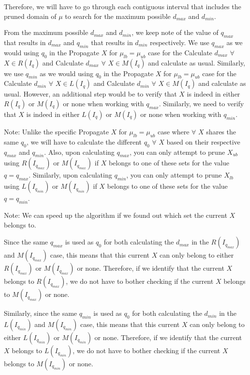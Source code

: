 \documentclass[a4paper,12pt]{article}
\begin{document}
%

Therefore, we will have to go through each contiguous interval that includes the pruned domain of $\mu$ to search for the maximum possible $d_{max}$ and $d_{min}$. 

From the maximum possible $d_{max}$ and $d_{min}$, we keep note of the value of $q_{max}$ that results in $d_{max}$ and $q_{min}$ that results in $d_{min}$ respectively. We use $q_{max}$ as we would using $q_{0}$ in the Propagate $X$ for $\mu_{lb}=\mu_{ub}$ case for the Calculate $d_{max}$ $\forall$ $X \in R(I_{q})$ and Calculate $d_{max}$ $\forall$ $X \in M(I_{q})$ and calculate as usual. Similarly, we use $q_{min}$
as we would using $q_{0}$ in the Propagate $X$ for $\mu_{lb}=\mu_{ub}$ case for the Calculate $d_{min}$ $\forall$ $X \in L(I_{q})$ and Calculate $d_{min}$ $\forall$ $X \in M(I_{q})$ and calculate as usual. However, an additional step would be to verify that $X$ is indeed in either $R(I_{q})$ or $ M(I_{q})$ or none when working with $q_{max}$. Similarly, we need to verify that $X$ is indeed in either $L(I_{q})$ or $M(I_{q})$ or none when working with $q_{min}$.

Note: Unlike the specific Propagate $X$ for $\mu_{lb}=\mu_{ub}$ case where $\forall$ $X$ shares the same $q_{0}$, we will have to calculate the different $q_{0}$ $\forall$ $X$ based on their respective $q_{max}$ and $q_{min}$. Also, upon calculating $q_{max}$, you can only attempt to prune $X_{ub}$ using $R(I_{q_{max}})$ or $M(I_{q_{max}})$ if $X$ belongs to one of these sets for the value $q = q_{max}$. Similarly, upon calculating $q_{min}$, you can only attempt to prune $X_{lb}$ using $L(I_{q_{min}})$ or $M(I_{q_{min}})$ if $X$ belongs to one of these sets for the value $q = q_{min}$.

Note: We can speed up the algorithm if we found out which set the current $X$ belongs to. 

Since the same $q_{max}$ is used as $q_{0}$ for both calculating the $d_{max}$ in the $R(I_{q_{max}})$ and $M(I_{q_{max}})$ case, this means that this current $X$ can only belong to either $R(I_{q_{max}})$  or $M(I_{q_{max}})$ or none. Therefore, if we identify that the current $X$ belongs to $R(I_{q_{max}})$, we do not have to bother checking if the current $X$ belongs to $M(I_{q_{max}})$ or none. 

Similarly, since the same $q_{min}$ is used as $q_{0}$ for both calculating the $d_{min}$ in the $L(I_{q_{min}})$ and $M(I_{q_{min}})$ case, this means that this current $X$ can only belong to either $L(I_{q_{min}})$  or $M(I_{q_{min}})$ or none. Therefore, if we identify that the current $X$ belongs to $L(I_{q_{min}})$, we do not have to bother checking if the current $X$ belongs to $M(I_{q_{min}})$ or none.  
 
\end{document}
